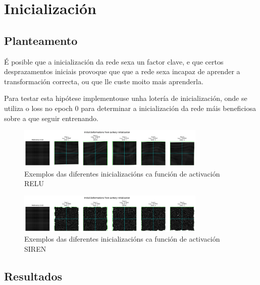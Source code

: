\section{Inicialización}
\label{sec:Inicialización}

\subsection{Planteamento}
\label{subsec:Planteamento-initialization}

É posible que a inicialización da rede sexa un factor clave, e que certos desprazamentos iniciais provoque que que a rede sexa incapaz de aprender a transformación correcta, ou que lle custe moito mais aprenderla.

Para testar esta hipótese implementouse unha lotería de inicialización, onde se utiliza o loss no epoch 0 para determinar a inicialización da rede máis beneficiosa sobre a que seguir entrenando.


\begin{figure}[ht]
    \centering
    \includegraphics[width=0.8\textwidth]{imaxes/lottery/initial_deformations_combinedMLP.png}
    \caption{Exemplos das diferentes inicializacións ca función de activación RELU}
    \label{fig:lottery_initial_deformations_combinedMLP}
\end{figure}

\begin{figure}[ht]
    \centering
    \includegraphics[width=0.8\textwidth]{imaxes/lottery/initial_deformations_combinedSIREN.png}
    \caption{Exemplos das diferentes inicializacións ca función de activación SIREN}
    \label{fig:lottery_initial_deformations_combinedSIREN}
\end{figure}


\subsection{Resultados}
\label{subsec:Resultados-initialization}



